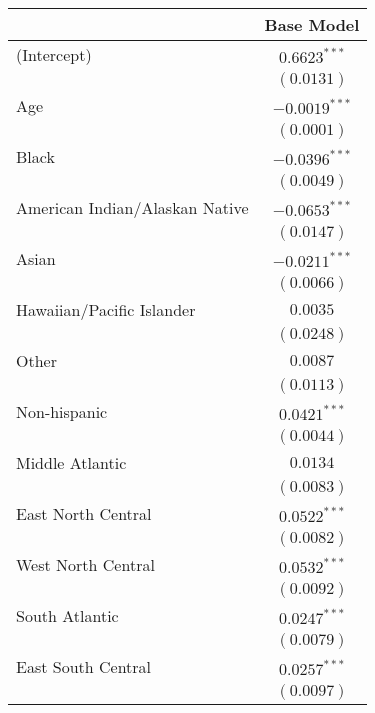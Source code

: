 \documentclass{article}
\begin{document}
\begin{table}
\begin{center}
\begin{tabular}{l c}
\hline
 & Base Model \\
\hline
(Intercept)                    & $0.6623^{***}$  \\
                               & $(0.0131)$      \\
Age                            & $-0.0019^{***}$ \\
                               & $(0.0001)$      \\
Black                          & $-0.0396^{***}$ \\
                               & $(0.0049)$      \\
American Indian/Alaskan Native & $-0.0653^{***}$ \\
                               & $(0.0147)$      \\
Asian                          & $-0.0211^{***}$ \\
                               & $(0.0066)$      \\
Hawaiian/Pacific Islander      & $0.0035$        \\
                               & $(0.0248)$      \\
Other                          & $0.0087$        \\
                               & $(0.0113)$      \\
Non-hispanic                   & $0.0421^{***}$  \\
                               & $(0.0044)$      \\
Middle Atlantic                & $0.0134$        \\
                               & $(0.0083)$      \\
East North Central             & $0.0522^{***}$  \\
                               & $(0.0082)$      \\
West North Central             & $0.0532^{***}$  \\
                               & $(0.0092)$      \\
South Atlantic                 & $0.0247^{***}$  \\
                               & $(0.0079)$      \\
East South Central             & $0.0257^{***}$  \\
                               & $(0.0097)$      \\

\end{tabular}
\end{center}
\end{table}
\end{document}
